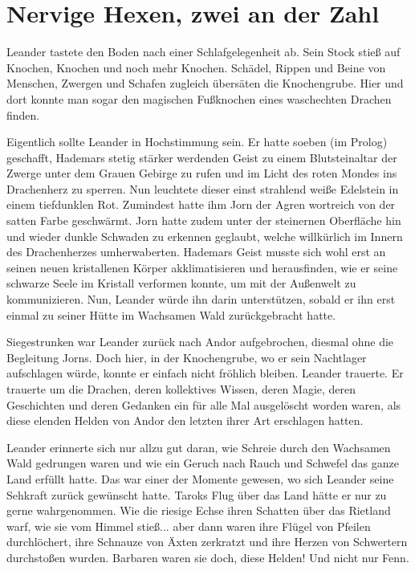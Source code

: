 \newpage
\section{Nervige Hexen, zwei an der Zahl}


Leander tastete den Boden nach einer Schlafgelegenheit ab. Sein Stock stieß auf Knochen, Knochen und noch mehr Knochen. Schädel, Rippen und Beine von Menschen, Zwergen und Schafen zugleich übersäten die Knochengrube. Hier und dort konnte man sogar den magischen Fußknochen eines waschechten Drachen finden.

Eigentlich sollte Leander in Hochstimmung sein. Er hatte soeben (im Prolog) geschafft, Hademars stetig stärker werdenden Geist zu einem Blutsteinaltar der Zwerge unter dem Grauen Gebirge zu rufen und im Licht des roten Mondes ins Drachenherz zu sperren. Nun leuchtete dieser einst strahlend weiße Edelstein in einem tiefdunklen Rot. Zumindest hatte ihm Jorn der Agren wortreich von der satten Farbe geschwärmt. Jorn hatte zudem unter der steinernen Oberfläche hin und wieder dunkle Schwaden zu erkennen geglaubt, welche willkürlich im Innern des Drachenherzes umherwaberten. Hademars Geist musste sich wohl erst an seinen neuen kristallenen Körper akklimatisieren und herausfinden, wie er seine schwarze Seele im Kristall verformen konnte, um mit der Außenwelt zu kommunizieren. Nun, Leander würde ihn darin unterstützen, sobald er ihn erst einmal zu seiner Hütte im Wachsamen Wald zurückgebracht hatte.

Siegestrunken war Leander zurück nach Andor aufgebrochen, diesmal ohne die Begleitung Jorns. Doch hier, in der Knochengrube, wo er sein Nachtlager aufschlagen würde, konnte er einfach nicht fröhlich bleiben. Leander trauerte. Er trauerte um die Drachen, deren kollektives Wissen, deren Magie, deren Geschichten und deren Gedanken ein für alle Mal ausgelöscht worden waren, als diese elenden Helden von Andor den letzten ihrer Art erschlagen hatten.

Leander erinnerte sich nur allzu gut daran, wie Schreie durch den Wachsamen Wald gedrungen waren und wie ein Geruch nach Rauch und Schwefel das ganze Land erfüllt hatte. Das war einer der Momente gewesen, wo sich Leander seine Sehkraft zurück gewünscht hatte. Taroks Flug über das Land hätte er nur zu gerne wahrgenommen. Wie die riesige Echse ihren Schatten über das Rietland warf, wie sie vom Himmel stieß... aber dann waren ihre Flügel von Pfeilen durchlöchert, ihre Schnauze von Äxten zerkratzt und ihre Herzen von Schwertern durchstoßen wurden. Barbaren waren sie doch, diese Helden! Und nicht nur Fenn.

